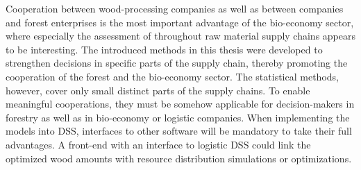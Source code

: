Cooperation between wood-processing companies as well as between companies and forest enterprises is the most important advantage of the bio-economy sector, where especially the assessment of throughout raw material supply chains appears to be interesting. The introduced methods in this thesis were developed to strengthen decisions in specific parts of the supply chain, thereby promoting the cooperation of the forest and the bio-economy sector. The statistical methods, however, cover only small distinct parts of the supply chains. To enable meaningful cooperations, they must be somehow applicable for decision-makers in forestry as well as in bio-economy or logistic companies. When implementing the models into DSS, interfaces to other software will be mandatory to take their full advantages. A front-end with an interface to logistic DSS could link the optimized wood amounts with resource distribution simulations or optimizations.